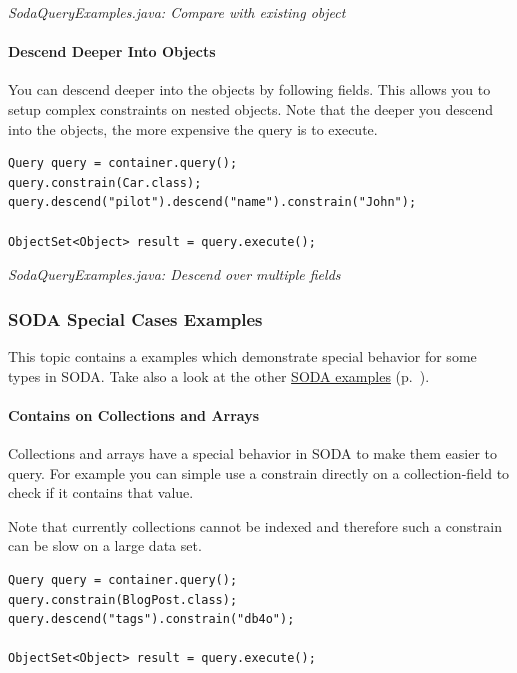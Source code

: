 {\small\itshape SodaQueryExamples.java: Compare with existing object\par}
\medskip

\paragraph{Descend Deeper Into Objects}
\label{ref:basics-querying-soda-soda-example-catelog:descendintoobjects}

You can descend deeper into the objects by following fields. This allows you to setup complex constraints on nested objects. Note that the deeper you descend into the objects, the more expensive the query is to execute.

\begin{lstlisting}
Query query = container.query();
query.constrain(Car.class);
query.descend("pilot").descend("name").constrain("John");

ObjectSet<Object> result = query.execute();
\end{lstlisting}

{\small\itshape SodaQueryExamples.java: Descend over multiple fields\par}
\medskip

\subsubsection{SODA Special Cases Examples}
\label{ref:basics-querying-soda-soda-special-case-examples}

This topic contains a examples which demonstrate special behavior for some types in SODA. Take also a look at the other \hyperref[ref:basics-querying-soda-soda-example-catelog]{SODA examples} (p.~\pageref{ref:basics-querying-soda-soda-example-catelog}).

\paragraph{Contains on Collections and Arrays}
\label{ref:basics-querying-soda-soda-special-case-examples:containsoncollections}

Collections and arrays have a special behavior in SODA to make them easier to query. For example you can simple use a constrain directly on a collection-field to check if it contains that value.

Note that currently collections cannot be indexed and therefore such a constrain can be slow on a large data set.

\begin{lstlisting}
Query query = container.query();
query.constrain(BlogPost.class);
query.descend("tags").constrain("db4o");

ObjectSet<Object> result = query.execute();
\end{lstlisting}


